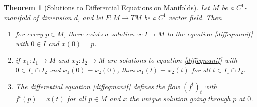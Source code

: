 \documentclass[11pt, a4paper]{memoir}
\theoremstyle{break}
\newtheorem{thm}{Theorem}
\theoremstyle{break}
\theoremstyle{nonumberplain}
\begin{document}
\begin{thm}[Solutions to Differential Equations on Manifolds]\label{ThmManifDiffEq}
Let $M$ be a $C^1$-manifold of dimension $d$, and let $F:M\to TM$ be a $C^1$ vector field. Then
\begin{enumerate}[label=(\roman*)]
	\item for every $p\in M$, there exists a solution $x:I\to M$ to the equation \ref{diffeqmanif} with $0\in I$ and $x(0)=p$.
	\item if $x_1:I_1\to M$ and $x_2:I_2\to M$ are solutions to equation \ref{diffeqmanif} with $0\in I_1\cap I_2$ and $x_1(0)=x_2(0)$, then $x_1(t)=x_2(t)$ for all $t\in I_1\cap I_2$.
	\item The differential equation \ref{diffeqmanif} defines the flow $(f^t)_t$ with $f^t(p)=x(t)$ for all $p\in M$ and $x$ the unique solution going through $p$ at $0$.
\end{enumerate}

\end{thm}
\end{document}
